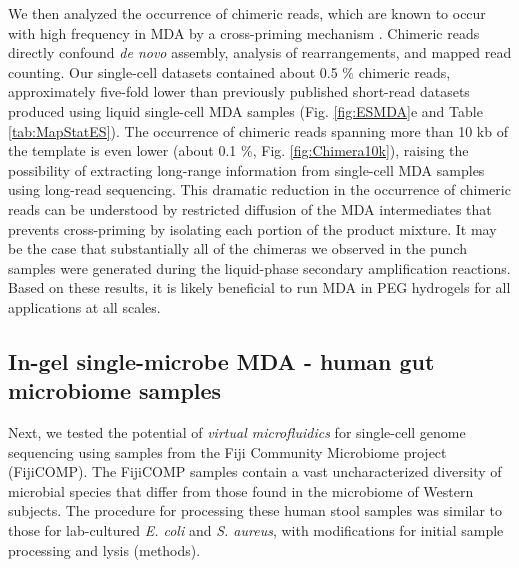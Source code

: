 We then analyzed the occurrence of chimeric reads, which are known to occur with high frequency in MDA by a cross-priming mechanism \cite{Lasken:2007db}. Chimeric reads directly confound \textit{de novo} assembly, analysis of rearrangements, and mapped read counting. Our single-cell datasets contained about 0.5 \% chimeric reads, approximately five-fold lower than previously published short-read datasets produced using liquid single-cell MDA samples (Fig. \ref{fig:ESMDA}e and Table \ref{tab:MapStatES}). The occurrence of chimeric reads spanning more than 10 kb of the template is even lower (about 0.1 \%, Fig. \ref{fig:Chimera10k}), raising the possibility of extracting long-range information from single-cell MDA samples using long-read sequencing. This dramatic reduction in the occurrence of chimeric reads can be understood by restricted diffusion of the MDA intermediates that prevents cross-priming by isolating each portion of the product mixture. It may be the case that substantially all of the chimeras we observed in the punch samples were generated during the liquid-phase secondary amplification reactions. Based on these results, it is likely beneficial to run MDA in PEG hydrogels for all applications at all scales. 

\subsection{In-gel single-microbe MDA - human gut microbiome samples}
Next, we tested the potential of \textit{virtual microfluidics} for single-cell genome sequencing using samples from the Fiji Community Microbiome project (FijiCOMP). The FijiCOMP samples contain a vast uncharacterized diversity of microbial species that differ from those found in the microbiome of Western subjects. The procedure for processing these human stool samples was similar to those for lab-cultured \textit{E. coli} and \textit{S. aureus}, with modifications for initial sample processing and lysis (methods).

